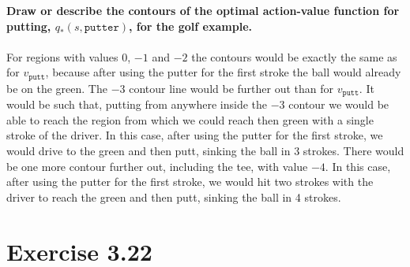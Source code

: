\documentclass[a4paper,11pt]{article}
\numberwithin{equation}{section}
\theoremstyle{remark}
\begin{document}
\textbf{Draw or describe the contours of the optimal action-value function for putting, $q_*(s, \texttt{putter})$, for the golf example.}
\\ \\
For regions with values $0$, $-1$ and $-2$ the contours would be exactly the same as for $v_{\texttt{putt}}$, because after using the putter for the first stroke the ball would already be on the green. The $-3$ contour line would be further out than for $v_{\texttt{putt}}$. It would be such that, putting from anywhere inside the $-3$ contour we would be able to reach the region from which we could reach then green with a single stroke of the driver. In this case, after using the putter for the first stroke, we would drive to the green and then putt, sinking the ball in 3 strokes.
There would be one more contour further out, including the tee, with value $-4$. In this case, after using the putter for the first stroke, we would hit two strokes with the driver to reach the green and then putt, sinking the ball in 4 strokes.


\section{Exercise 3.22}
\end{document}
